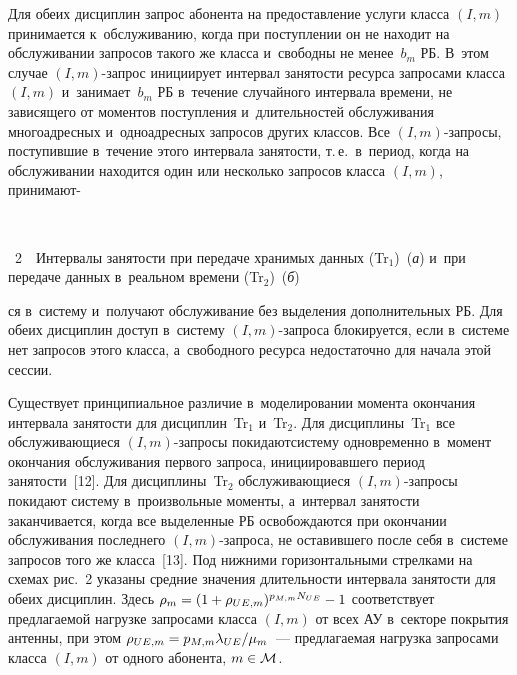 \begin{multicols}{2}
 
  
  Для обеих дисциплин запрос абонента на предостав\-ле\-ние услуги класса 
$({I}, m)$ принимается к~обслуживанию, когда при по\-ступ\-ле\-нии он не 
находит на обслуживании запросов такого же класса и~свободны не 
менее~$b_m$ РБ. В~этом случае $({I}, m)$-за\-прос ини\-ци\-иру\-ет 
интервал за\-ня\-тости ресурса запросами класса $({I}, m)$ и~занимает~$b_m$ РБ в~течение случайного интервала времени, не зависящего от 
моментов по\-ступ\-ле\-ния и~длительностей обслуживания многоадресных 
и~одноадресных запросов других классов. Все $({I}, m)$-за\-про\-сы, 
по\-сту\-пив\-шие в~течение этого интервала за\-ня\-тости, т.\,е.\ в~период, когда на 
обслуживании находится один или несколько запросов класса $({I}, 
m)$, принимают-\linebreak\vspace*{-12pt}

{ \begin{center}  %
 \vspace*{-1pt}
   \mbox{%
\epsfxsize=79mm 
}

\end{center}



\noindent
{{\figurename~2}\ \ \small{Интервалы за\-ня\-тости при передаче хранимых данных (Tr$_1$)~(\textit{а}) 
и~при передаче данных в~реальном времени (Tr$_2$)~(\textit{б})
}}}

\vspace*{9pt}

\addtocounter{figure}{1}

\noindent
ся в~сис\-те\-му и~получают обслуживание без выделения 
дополнительных РБ. Для обеих дис\-цип\-лин до\-ступ в~сис\-те\-му  
$({I}, m)$-за\-про\-са блокируется, если в~сис\-те\-ме нет запросов этого 
класса, а~свободного ресурса недостаточно для начала этой сессии.




  
  Существует принципиальное различие в~моделировании момента окончания 
интервала за\-ня\-тости для дис\-цип\-лин~Tr$_1$ и~Tr$_2$. Для дис\-цип\-ли\-ны~Tr$_1$\linebreak 
все об\-слу\-жи\-ва\-ющи\-еся $({I}, m)$-за\-про\-сы покидают\linebreak сис\-те\-му 
одновременно в~момент окончания обслуживания первого запроса, 
ини\-ци\-иро\-вав\-ше\-го период за\-ня\-тости~[12]. Для дис\-цип\-лины~Tr$_2$ 
об\-слу\-жи\-ва\-ющи\-еся $({I}, m)$-за\-про\-сы покидают сис\-те\-му 
в~\mbox{произвольные} моменты, а~интервал за\-ня\-тости заканчивается, когда все 
выделенные РБ осво\-бож\-да\-ют\-ся при окончании обслуживания последнего 
$({I}, m)$-за\-про\-са, не оставившего после себя в~сис\-те\-ме запросов 
того же класса~[13]. Под ниж\-ни\-ми горизонтальными стрелками на схемах 
рис.~2 указаны сред\-ние значения дли\-тель\-ности интервала за\-ня\-тости для 
обеих дис\-цип\-лин. Здесь $\rho_m\hm= (1\hm+ \rho_{UE,m})^{p_{M,m}N_{UE}} 
\hm-1$ со\-от\-вет\-ст\-ву\-ет пред\-ла\-га\-емой нагрузке запросами класса $({I}, m)$ 
от всех АУ в~секторе покрытия антенны, при этом $\rho_{UE,m}\hm= p_{M,m} 
\lambda_{UE}/\mu_m$~--- пред\-ла\-га\-емая на\-груз\-ка запросами класса 
$({I}, m)$ от одного абонента, $m\hm\in \mathcal{M}$.



\end{multicols}
